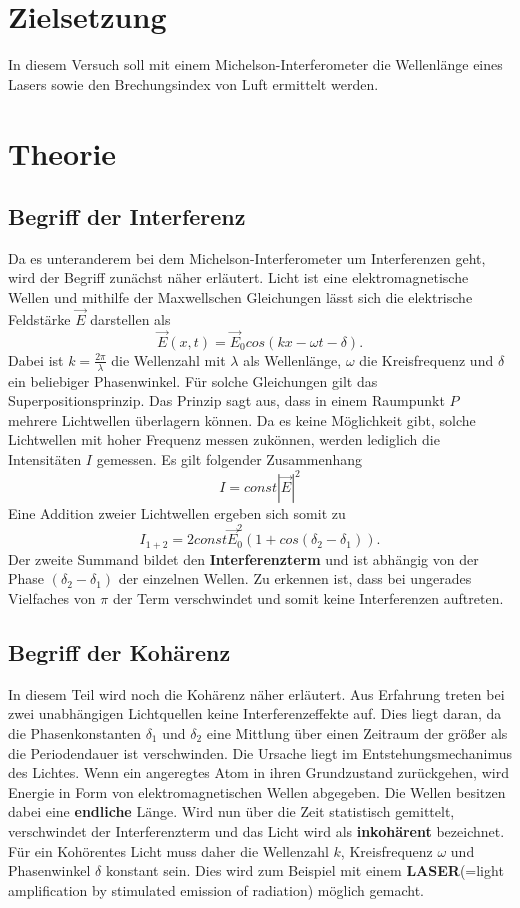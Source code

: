 \section{Zielsetzung}
In diesem Versuch soll mit einem Michelson-Interferometer
die Wellenlänge eines Lasers sowie den Brechungsindex von Luft
ermittelt werden.
\section{Theorie}
\subsection{Begriff der Interferenz}
Da es unteranderem bei dem Michelson-Interferometer um Interferenzen geht,
wird der Begriff zunächst näher erläutert.
Licht ist eine elektromagnetische Wellen und mithilfe der Maxwellschen Gleichungen
lässt sich die elektrische Feldstärke $\vec{E}$ darstellen als
\begin{equation*}
  \vec{E}(x,t) = \vec{E}_0 cos(kx-\omega t - \delta).
\end{equation*}
Dabei ist $k = \frac{2\pi}{\lambda}$ die Wellenzahl mit $\lambda$ als Wellenlänge, $\omega$ die Kreisfrequenz
und $\delta$ ein beliebiger Phasenwinkel. Für solche Gleichungen gilt das Superpositionsprinzip.
Das Prinzip sagt aus, dass in einem Raumpunkt $P$ mehrere Lichtwellen überlagern können. Da es keine Möglichkeit gibt,
solche Lichtwellen mit hoher Frequenz messen zukönnen, werden lediglich die Intensitäten $I$ gemessen. Es gilt folgender Zusammenhang
\begin{equation*}
  I = const |\vec{E}|^2
\end{equation*}
Eine Addition zweier Lichtwellen ergeben sich somit zu
\begin{equation*}
  I_{1+2} = 2const\vec{E}^2_0 (1+cos(\delta_2 - \delta_1)).
\end{equation*}
Der zweite Summand bildet den \textbf{Interferenzterm} und ist abhängig von der Phase $(\delta_2 - \delta_1)$
der einzelnen Wellen. Zu erkennen ist, dass bei ungerades Vielfaches von $\pi$ der Term verschwindet und somit keine
Interferenzen auftreten.
\subsection{Begriff der Kohärenz}
In diesem Teil wird noch die Kohärenz näher erläutert. Aus Erfahrung treten bei zwei unabhängigen Lichtquellen
keine Interferenzeffekte auf. Dies liegt daran, da die Phasenkonstanten $\delta_1$ und $\delta_2$ eine Mittlung über einen
Zeitraum der größer als die Periodendauer ist verschwinden. Die Ursache liegt im Entstehungsmechanimus des Lichtes.
Wenn ein angeregtes Atom in ihren Grundzustand zurückgehen, wird Energie in Form von elektromagnetischen Wellen abgegeben.
Die Wellen besitzen dabei eine \textbf{endliche} Länge. Wird nun über die Zeit statistisch gemittelt, verschwindet der Interferenzterm und
das Licht wird als \textbf{inkohärent} bezeichnet.
Für ein Kohörentes Licht muss daher die Wellenzahl $k$, Kreisfrequenz $\omega$ und Phasenwinkel $\delta$ konstant sein.
Dies wird zum Beispiel mit einem \textbf{LASER}(=light amplification by stimulated emission of radiation) möglich gemacht.

